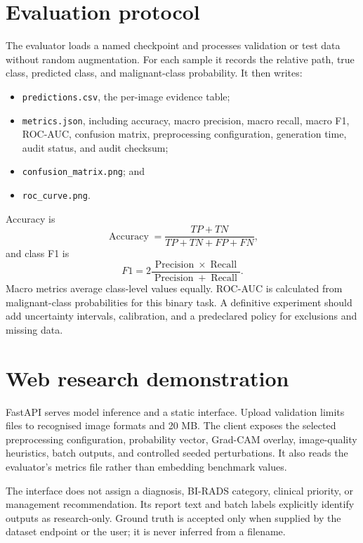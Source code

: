 \section{Evaluation protocol}
The evaluator loads a named checkpoint and processes validation or test data without random augmentation. For each sample it records the relative path, true class, predicted class, and malignant-class probability. It then writes:

\begin{itemize}
    \item \texttt{predictions.csv}, the per-image evidence table;
    \item \texttt{metrics.json}, including accuracy, macro precision, macro recall, macro F1, ROC-AUC, confusion matrix, preprocessing configuration, generation time, audit status, and audit checksum;
    \item \texttt{confusion\_matrix.png}; and
    \item \texttt{roc\_curve.png}.
\end{itemize}

Accuracy is
\begin{equation}
\operatorname{Accuracy}=\frac{TP+TN}{TP+TN+FP+FN},
\end{equation}
and class F1 is
\begin{equation}
F1=2\frac{\operatorname{Precision}\times\operatorname{Recall}}{\operatorname{Precision}+\operatorname{Recall}}.
\end{equation}
Macro metrics average class-level values equally. ROC-AUC is calculated from malignant-class probabilities for this binary task. A definitive experiment should add uncertainty intervals, calibration, and a predeclared policy for exclusions and missing data.

\section{Web research demonstration}
FastAPI serves model inference and a static interface. Upload validation limits files to recognised image formats and 20 MB. The client exposes the selected preprocessing configuration, probability vector, Grad-CAM overlay, image-quality heuristics, batch outputs, and controlled seeded perturbations. It also reads the evaluator's metrics file rather than embedding benchmark values.

The interface does not assign a diagnosis, BI-RADS category, clinical priority, or management recommendation. Its report text and batch labels explicitly identify outputs as research-only. Ground truth is accepted only when supplied by the dataset endpoint or the user; it is never inferred from a filename.

